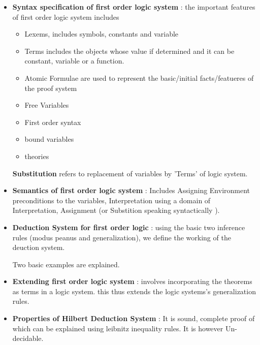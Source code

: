 \begin{itemize}
	\item{\textbf{Syntax specification of first order logic system} : the important features of first order logic system includes 
		\begin{itemize}
			\item {Lexems, includes symbols, constants and variable }
			\item{Terms includes the objects whose value if determined and it can be constant, variable or a function.}
			\item{Atomic Formulae are used to represent the basic/initial facts/featueres of the proof system }
			\item{Free Variables}
			\item{First order syntax}
			\item{bound variables}
			\item{theories}
		\end{itemize}

	\textbf{Substitution} refers to replacement of variables by 'Terms' of logic system.
	}
	
	\item{\textbf{Semantics of first order logic system} : Includes Assigning Environment preconditions to the variables, Interpretation using a domain of Interpretation, Assignment (or Substition speaking syntactically ).  

	}
	
	\item{\textbf{Deduction System for first order logic} : using the basic two inference rules (modus peanus and generalization), we define the working of the deuction system.

	Two basic examples are explained.
	}

	\item{\textbf{Extending first order logic system} : involves incorporating the theorems as terms in a logic system. this thus extends the logic systems's generalization rules.
	}

	\item{\textbf{Properties of Hilbert Deduction System} : 
	It is sound, complete proof of which can be explained using leibnitz inequality rules. It is however Un-decidable.
	}
		
\end{itemize}
